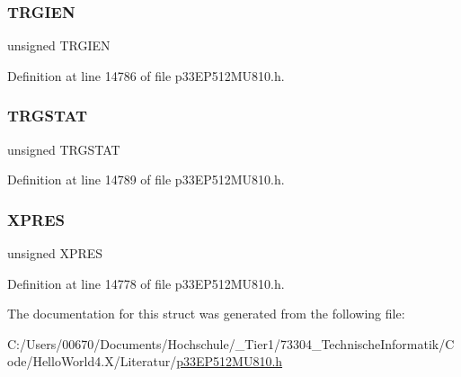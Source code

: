 \subsubsection{\texorpdfstring{T\+R\+G\+I\+EN}{TRGIEN}}
{\footnotesize\ttfamily unsigned T\+R\+G\+I\+EN}



Definition at line 14786 of file p33\+E\+P512\+M\+U810.\+h.

\mbox{\label{structtag_p_w_m_c_o_n4_b_i_t_s_a57c6135a12bae69a2a2cac5ed50a4a6d}} 
\subsubsection{\texorpdfstring{T\+R\+G\+S\+T\+AT}{TRGSTAT}}
{\footnotesize\ttfamily unsigned T\+R\+G\+S\+T\+AT}



Definition at line 14789 of file p33\+E\+P512\+M\+U810.\+h.

\mbox{\label{structtag_p_w_m_c_o_n4_b_i_t_s_a6a3f824223966417e0005dbe08b1833c}} 
\subsubsection{\texorpdfstring{X\+P\+R\+ES}{XPRES}}
{\footnotesize\ttfamily unsigned X\+P\+R\+ES}



Definition at line 14778 of file p33\+E\+P512\+M\+U810.\+h.



The documentation for this struct was generated from the following file\+:\begin{DoxyCompactItemize}
\item 
C\+:/\+Users/00670/\+Documents/\+Hochschule/\+\_\+\+Tier1/73304\+\_\+\+Technische\+Informatik/\+Code/\+Hello\+World4.\+X/\+Literatur/\hyperlink{p33_e_p512_m_u810_8h}{p33\+E\+P512\+M\+U810.\+h}\end{DoxyCompactItemize}
